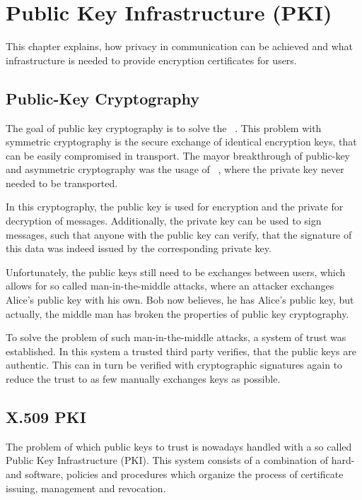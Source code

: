 \chapter{Public Key Infrastructure (PKI)}\label{ch:publicKeyInfrastructure}

This chapter explains, how privacy in communication can be achieved and what infrastructure is needed to provide
encryption certificates for users.

\section{Public-Key Cryptography}\label{sec:publicKeyCryptography}
The goal of public key cryptography is to solve the ~\cite{diffie1976new}.
This problem with symmetric cryptography is the secure exchange of identical encryption keys, that can be easily
compromised in transport.
The mayor breakthrough of public-key and asymmetric cryptography was the usage of ~\cite{schneier2007applied}, where the private key never needed to be transported.

In this cryptography, the public key is used for encryption and the private for decryption of messages.
Additionally, the private key can be used to sign messages, such that anyone with the public key can verify, that the
signature of this data was indeed issued by the corresponding private key.

Unfortunately, the public keys still need to be exchanges between users, which allows for so called man-in-the-middle
attacks, where an attacker exchanges Alice's public key with his own.
Bob now believes, he has Alice's public key, but actually, the middle man has broken the properties of public key
cryptography.

To solve the problem of such man-in-the-middle attacks, a system of trust was established.
In this system a trusted third party verifies, that the public keys are authentic.
This can in turn be verified with cryptographic signatures again to reduce the trust to as few manually exchanges keys
as possible.

\section{X.509 PKI}\label{sec:publicKeyInfrastructure}
The problem of which public keys to trust is nowadays handled with a so called Public Key Infrastructure (PKI).
This system consists of a combination of hard- and software, policies and procedures which organize the process of
certificate issuing, management and revocation.


